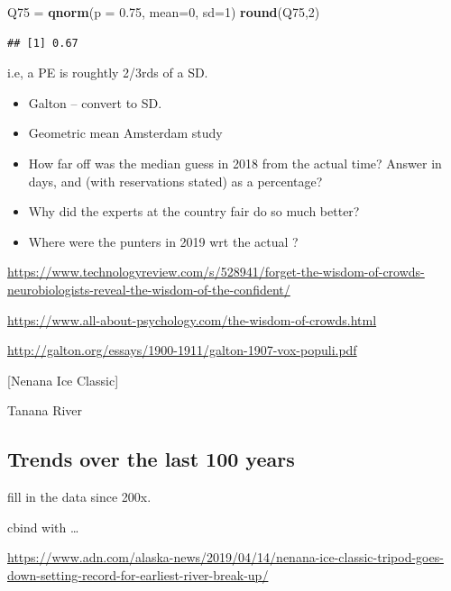 \documentclass[]{book}
\newenvironment{Shaded}{\begin{snugshade}}{\end{snugshade}}
\newcommand{\DataTypeTok}[1]{\textcolor[rgb]{0.13,0.29,0.53}{#1}}
\newcommand{\DecValTok}[1]{\textcolor[rgb]{0.00,0.00,0.81}{#1}}
\newcommand{\FloatTok}[1]{\textcolor[rgb]{0.00,0.00,0.81}{#1}}
\newcommand{\KeywordTok}[1]{\textcolor[rgb]{0.13,0.29,0.53}{\textbf{#1}}}
\newcommand{\NormalTok}[1]{#1}
\newcommand{\StringTok}[1]{\textcolor[rgb]{0.31,0.60,0.02}{#1}}
\begin{document}
\begin{Shaded}
\begin{Highlighting}[]
\NormalTok{Q75 =}\StringTok{ }\KeywordTok{qnorm}\NormalTok{(}\DataTypeTok{p =} \FloatTok{0.75}\NormalTok{, }\DataTypeTok{mean=}\DecValTok{0}\NormalTok{, }\DataTypeTok{sd=}\DecValTok{1}\NormalTok{)}
\KeywordTok{round}\NormalTok{(Q75,}\DecValTok{2}\NormalTok{)}
\end{Highlighting}
\end{Shaded}

\begin{verbatim}
## [1] 0.67
\end{verbatim}

i.e, a PE is roughtly 2/3rds of a SD.

\begin{itemize}
\item
  Galton -- convert to SD.
\item
  Geometric mean Amsterdam study
\item
  How far off was the median guess in 2018 from the actual time? Answer in days, and (with reservations stated) as a percentage?
\item
  Why did the experts at the country fair do so much better?
\item
  Where were the punters in 2019 wrt the actual ?
\end{itemize}

\url{https://www.technologyreview.com/s/528941/forget-the-wisdom-of-crowds-neurobiologists-reveal-the-wisdom-of-the-confident/}

\url{https://www.all-about-psychology.com/the-wisdom-of-crowds.html}

\url{http://galton.org/essays/1900-1911/galton-1907-vox-populi.pdf}

{[}Nenana Ice Classic{]}

Tanana River

\hypertarget{trends-over-the-last-100-years-1}{%
\subsection{Trends over the last 100 years}\label{trends-over-the-last-100-years-1}}

fill in the data since 200x.

cbind with \ldots{}

\url{https://www.adn.com/alaska-news/2019/04/14/nenana-ice-classic-tripod-goes-down-setting-record-for-earliest-river-break-up/}
\end{document}
